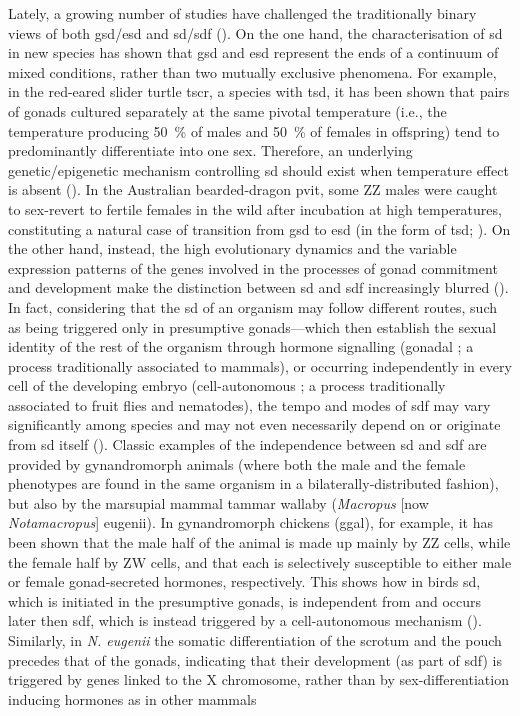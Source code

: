 Lately, a growing number of studies have challenged the traditionally binary views of both \gls{gsd}/\gls{esd} and \gls{sd}/\gls{sdf} (). On the one hand, the characterisation of \gls{sd} in new species has shown that \gls{gsd} and \gls{esd} represent the ends of a continuum of mixed conditions, rather than two mutually exclusive phenomena. For example, in the red-eared slider turtle \gls{tscr}, a species with \gls{tsd}, it has been shown that pairs of gonads cultured separately at the same pivotal temperature (i.e., the temperature producing \qty{50}{\percent} of males and \qty{50}{\percent} of females in offspring) tend to predominantly differentiate into one sex. Therefore, an underlying genetic/epigenetic mechanism controlling \gls{sd} should exist when temperature effect is absent (). In the Australian bearded-dragon \gls{pvit}, some ZZ males were caught to sex-revert to fertile females in the wild after incubation at high temperatures, constituting a natural case of transition from \gls{gsd} to \gls{esd} (in the form of \gls{tsd}; ). On the other hand, instead, the high evolutionary dynamics and the variable expression patterns of the genes involved in the processes of gonad commitment and development make the distinction between \gls{sd} and \gls{sdf} increasingly blurred (). In fact, considering that the \gls{sd} of an organism may follow different routes, such as being triggered only in presumptive gonads---which then establish the sexual identity of the rest of the organism through hormone signalling (gonadal ; a process traditionally associated to mammals), or occurring independently in every cell of the developing embryo (cell-autonomous ; a process traditionally associated to fruit flies and nematodes), the tempo and modes of \gls{sdf} may vary significantly among species and may not even necessarily depend on or originate from \gls{sd} itself (). Classic examples of the independence between \gls{sd} and \gls{sdf} are provided by gynandromorph animals (where both the male and the female phenotypes are found in the same organism in a bilaterally-distributed fashion), but also by the marsupial mammal tammar wallaby (\textit{Macropus} [now \textit{Notamacropus}] {eugenii}). In gynandromorph chickens (\gls{ggal}), for example, it has been shown that the male half of the animal is made up mainly by ZZ cells, while the female half by ZW cells, and that each is selectively susceptible to either male or female gonad-secreted hormones, respectively. This shows how in birds \gls{sd}, which is initiated in the presumptive gonads, is independent from and occurs later then \gls{sdf}, which is instead triggered by a cell-autonomous mechanism (). Similarly, in \textit{N. eugenii} the somatic differentiation of the scrotum and the pouch precedes that of the gonads, indicating that their development (as part of \gls{sdf}) is triggered by genes linked to the X chromosome, rather than by sex-differentiation inducing hormones as in other mammals 